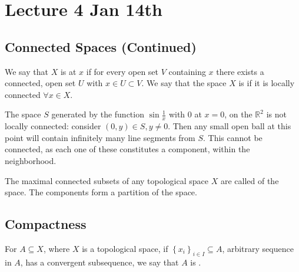 \documentclass[notoc,notitlepage]{tufte-book}
\begin{document}


\chapter{Lecture 4 Jan 14th}%
\label{chp:lecture_4_jan_14th}

\section{Connected Spaces (Continued)}%
\label{sec:connected_spaces_continued}

\begin{defn}\label{defn:locally_connected}
  We say that $X$ is  at $x$ if for every open set $V$
  containing $x$ there exists a connected, open set $U$ with $x ∈ U ⊂ V$. We say that
  the space $X$ is  if it is locally connected $\forall x \in X$.
\end{defn}

\begin{eg}
  The space $S$ generated by the function $\sin \frac{1}{x}$ with $0$ at $x = 0$,
  on the $\mathbb{R}^2$ is not locally connected: consider $(0, y) \in S, y \neq 0$.
  Then any small open ball at this point will contain infinitely many line segments from $S$.
  This cannot be connected, as each one of these constitutes a component,
  within the neighborhood.
\end{eg}

\begin{defn}\label{defn:connected_component}
  The maximal connected subsets of any topological space $X$ are called
   of the space. The components form a partition
  of the space.
\end{defn}


\section{Compactness}%
\label{sec:compactness}

\begin{defn}\label{defn:sequential_compactness}
  For $A \subseteq X$, where $X$ is a topological space, if 
  $\left\{ x_i \right\}_{i \in I} \subseteq A$, arbitrary sequence in $A$, has a
  convergent subsequence, we say that $A$ is .
\end{defn}
\end{document}
